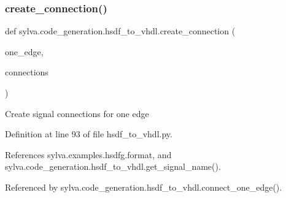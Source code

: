 \subsubsection{\texorpdfstring{create\+\_\+connection()}{create\_connection()}}
{\footnotesize\ttfamily def sylva.\+code\+\_\+generation.\+hsdf\+\_\+to\+\_\+vhdl.\+create\+\_\+connection (\begin{DoxyParamCaption}\item[{}]{one\+\_\+edge,  }\item[{}]{connections }\end{DoxyParamCaption})}

\begin{DoxyVerb}Create signal connections for one edge
\end{DoxyVerb}
 

Definition at line 93 of file hsdf\+\_\+to\+\_\+vhdl.\+py.



References sylva.\+examples.\+hsdfg.\+format, and sylva.\+code\+\_\+generation.\+hsdf\+\_\+to\+\_\+vhdl.\+get\+\_\+signal\+\_\+name().



Referenced by sylva.\+code\+\_\+generation.\+hsdf\+\_\+to\+\_\+vhdl.\+connect\+\_\+one\+\_\+edge().


